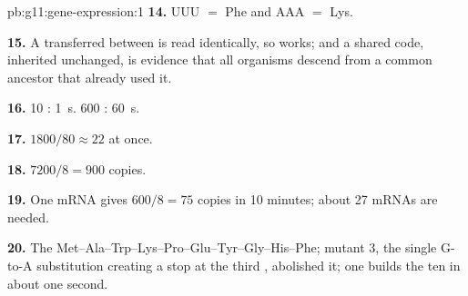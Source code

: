 \begin{solution}{pb:g11:gene-expression:1}
\textbf{14.} UUU $=$ Phe and AAA $=$ Lys.

\textbf{15.} A  transferred between  is read identically,
so  works; and a shared code, inherited unchanged, is
evidence that all organisms descend from a common ancestor that
already used it.

\textbf{16.} 10 : \qty{1}{s}. 600 : \qty{60}{s}.

\textbf{17.} $1800/80 \approx 22$  at once.

\textbf{18.} $7200/8 = 900$ copies.

\textbf{19.} One mRNA gives $600/8 = 75$ copies in 10 minutes; about
27 mRNAs are needed.

\textbf{20.} The 
Met--Ala--Trp--Lys--Pro--Glu--Tyr--Gly--His--Phe; mutant 3, the single
G-to-A substitution creating a stop at the third , abolished it;
one  builds the ten  in about one second.
\end{solution}
